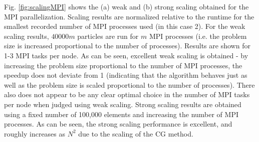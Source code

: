 \documentclass[10pt]{article}
\begin{document}
Fig. \ref{fig:scalingMPI} shows the (a) weak and (b) strong scaling obtained for the MPI parallelization. Scaling results are normalized relative to the runtime for the smallest recorded number of MPI processes used (in this case 2). For the weak scaling results, \(40000m\) particles are run for \(m\) MPI processes (i.e. the problem size is increased proportional to the number of processes). Results are shown for 1-3 MPI tasks per node. As can be seen, excellent weak scaling is obtained - by increasing the problem size proportional to the number of MPI processes, the speedup does not deviate from 1 (indicating that the algorithm behaves just as well as the problem size is scaled proportional to the number of processes). There also does not appear to be any clear optimal choice in the number of MPI tasks per node when judged using weak scaling. Strong scaling results are obtained using a fixed number of 100,000 elements and increasing the number of MPI processes. As can be seen, the strong scaling performance is excellent, and roughly increases as \(N^2\) due to the scaling of the CG method.
\end{document}
